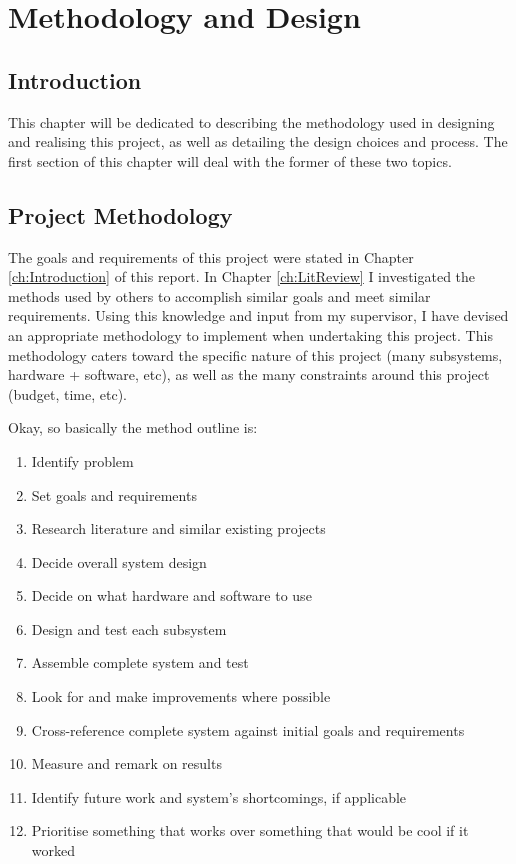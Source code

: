 \glsresetall %
\chapter{Methodology and Design}
\label{ch:Methodology}

\section{Introduction}
\label{sec:MethodologyIntro}

This chapter will be dedicated to describing the methodology used in designing and realising this project, as well as detailing the design choices and process. The first section of this chapter will deal with the former of these two topics. 

\section{Project Methodology}
\label{sec:Methodology}

The goals and requirements of this project were stated in Chapter \ref{ch:Introduction} of this report. In Chapter \ref{ch:LitReview} I investigated the methods used by others to accomplish similar goals and meet similar requirements. Using this knowledge and input from my supervisor, I have devised an appropriate methodology to implement when undertaking this project. This methodology caters toward the specific nature of this project (many subsystems, hardware + software, etc), as well as the many constraints around this project (budget, time, etc).

Okay, so basically the method outline is:
\begin{enumerate}
    \item Identify problem
    \item Set goals and requirements
    \item Research literature and similar existing projects
    \item Decide overall system design
    \item Decide on what hardware and software to use
    \item Design and test each subsystem
    \item Assemble complete system and test
    \item Look for and make improvements where possible
    \item Cross-reference complete system against initial goals and requirements
    \item Measure and remark on results
    \item Identify future work and system's shortcomings, if applicable
    \item Prioritise something that works over something that would be cool if it worked
\end{enumerate}

